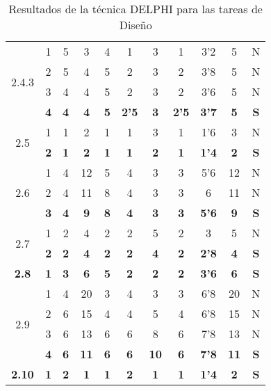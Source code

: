 \documentclass[11pt,a4paper,spanish,twoside]{report}
\begin{document}
\begin{table}[!h]
\begin{tabular}{|c|c||c|c|c|c|c||c|c|c||c|}
    \multirow{4}{*}{2.4.3}& 1 & 5 & 3 & 4 & 1 & 3 & 1 & 3'2 & 5 & N \\
    & 2 & 5 & 4 & 5 & 2 & 3 & 2 & 3'8 & 5 & N \\
    & 3 & 4 & 4 & 5 & 2 & 3 & 2 & 3'6 & 5 & N \\
    & \textbf{4} & \textbf{4} & \textbf{4} & \textbf{5} & \textbf{2'5} & \textbf{3} & \textbf{2'5} & \textbf{3'7} & \textbf{5} & \textbf{S} \\
    \hline

    \multirow{2}{*}{2.5}& 1 & 1 & 2 & 1 & 1 & 3 & 1 & 1'6 & 3 & N \\
    & \textbf{2} & \textbf{1} & \textbf{2} & \textbf{1} & \textbf{1} & \textbf{2} & \textbf{1} & \textbf{1'4} & \textbf{2} & \textbf{S} \\
    \hline

    \multirow{3}{*}{2.6}& 1 & 4 & 12 & 5 & 4 & 3 & 3 & 5'6 & 12 & N \\
    & 2 & 4 & 11 & 8 & 4 & 3 & 3 & 6 & 11 & N \\
    & \textbf{3} & \textbf{4} & \textbf{9} & \textbf{8} & \textbf{4} & \textbf{3} & \textbf{3} & \textbf{5'6} & \textbf{9} & \textbf{S} \\
    \hline

    \multirow{2}{*}{2.7}& 1 & 2 & 4 & 2 & 2 & 5 & 2 & 3 & 5 & N \\
    & \textbf{2} & \textbf{2} & \textbf{4} & \textbf{2} & \textbf{2} & \textbf{4} & \textbf{2} & \textbf{2'8} & \textbf{4} & \textbf{S} \\
    \hline

    \textbf{2.8} & \textbf{1} & \textbf{3} & \textbf{6} & \textbf{5} & \textbf{2} & \textbf{2} & \textbf{2} & \textbf{3'6} & \textbf{6} & \textbf{S} \\
    \hline

    \multirow{4}{*}{2.9}& 1 & 4 & 20 & 3 & 4 & 3 & 3 & 6'8 & 20 & N \\
    & 2 & 6 & 15 & 4 & 4 & 5 & 4 & 6'8 & 15 & N \\
    & 3 & 6 & 13 & 6 & 6 & 8 & 6 & 7'8 & 13 & N \\
    & \textbf{4} & \textbf{6} & \textbf{11} & \textbf{6} & \textbf{6} & \textbf{10} & \textbf{6} & \textbf{7'8} & \textbf{11} & \textbf{S} \\
    \hline

    \textbf{2.10} & \textbf{1} & \textbf{2} & \textbf{1} & \textbf{1} & \textbf{2} & \textbf{1} & \textbf{1} & \textbf{1'4} & \textbf{2} & \textbf{S} \\
    \hline
  \end{tabular}
  \caption{Resultados de la técnica DELPHI para las tareas de
    Diseño} \label{Tab:dis}
\end{table}
\end{document}
